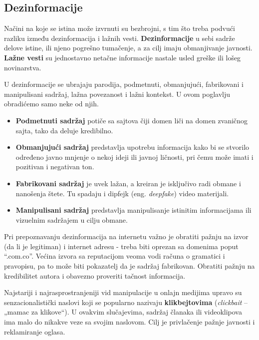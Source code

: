 \documentclass[a4paper]{article}
\begin{document}
\subsection{Dezinformacije}
\label{sec:naslovN}

Načini na koje se istina može izvrnuti su bezbrojni, s tim što treba podvući razliku između dezinformacija i lažnih vesti. \newline \textbf{Dezinformacije} u sebi sadrže delove istine, ili njeno pogrešno tumačenje, a za cilj imaju obmanjivanje javnosti. \newline \textbf{Lažne vesti} su jednostavno netačne informacije nastale usled greške ili lošeg novinarstva.    


U dezinformacije se ubrajaju parodija, podmetnuti, obmanjujući, fabrikovani i manipulisani sadržaj, lažna povezanost i lažni kontekst. U ovom poglavlju obradićemo samo neke od njih.


\begin{itemize}
    \item \textbf{Podmetnuti sadržaj} potiče sa sajtova čiji domen liči na domen zvaničnog sajta, tako da deluje kredibilno.
    \item \textbf{Obmanjujući sadržaj} predstavlja upotrebu informacija kako bi se stvorilo određeno javno mnjenje o nekoj ideji ili javnoj ličnosti, pri čemu može imati i pozitivan i negativan ton.
    \item \textbf{Fabrikovani sadržaj} je uvek lažan, a kreiran je isključivo radi obmane i nanošenja štete. Tu spadaju i dipfejk \cite{deepfake} (eng. \emph{deepfake}) video materijali.
    \item \textbf{Manipulisani sadržaj} predstavlja manipulisanje istinitim informacijama ili vizuelnim sadržajem u cilju obmane.
\end{itemize}


Pri prepoznavanju dezinformacija na internetu važno je obratiti pažnju na izvor (da li je legitiman) i internet adresu - treba biti oprezan sa domenima poput “.com.co”. Većina izvora sa reputacijom veoma vodi računa o gramatici i pravopisu, pa to može biti pokazatelj da je sadržaj fabrikovan. Obratiti pažnju na kredibilitet autora i obavezno proveriti tačnost informacija.


Najstariji i najrasprostranjeniji vid manipulacije u onlajn medijima upravo su 
senzacionalistički naslovi koji se popularno nazivaju \textbf{klikbejtovima} \cite{clickbait} (\emph{clickbait} – „mamac za klikove“). U ovakvim slučajevima, sadržaj članaka ili videoklipova ima malo do nikakve veze sa svojim naslovom. Cilj je privlačenje pažnje javnosti i reklamiranje oglasa. 
\end{document}
